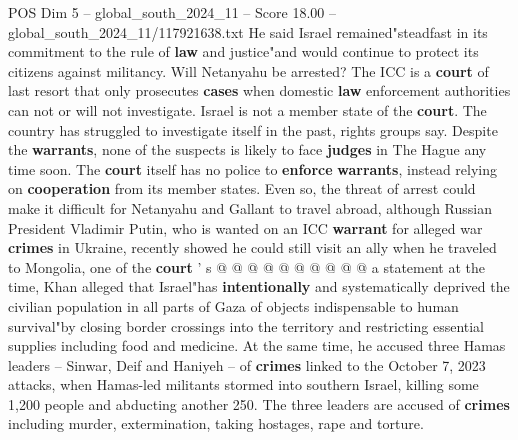 \begin{textsample}{POS Dim 5 – global\_south\_2024\_11 – Score 18.00 – global\_south\_2024\_11/117921638.txt}
He said Israel remained"steadfast in its commitment to the rule of \textbf{law} and justice"and would continue to protect its citizens against militancy.
Will Netanyahu be arrested?
The ICC is a \textbf{court} of last resort that only prosecutes \textbf{cases} when domestic \textbf{law} enforcement authorities can not or will not investigate.
Israel is not a member state of the \textbf{court}.
The country has struggled to investigate itself in the past, rights groups say.
Despite the \textbf{warrants}, none of the suspects is likely to face \textbf{judges} in The Hague any time soon.
The \textbf{court} itself has no police to \textbf{enforce} \textbf{warrants}, instead relying on \textbf{cooperation} from its member states.
Even so, the threat of arrest could make it difficult for Netanyahu and Gallant to travel abroad, although Russian President Vladimir Putin, who is wanted on an ICC \textbf{warrant} for alleged war \textbf{crimes} in Ukraine, recently showed he could still visit an ally when he traveled to Mongolia, one of the \textbf{court} ' s @ @ @ @ @ @ @ @ @ @ a statement at the time, Khan alleged that Israel"has \textbf{intentionally} and systematically deprived the civilian population in all parts of Gaza of objects indispensable to human survival"by closing border crossings into the territory and restricting essential supplies including food and medicine.
At the same time, he accused three Hamas leaders -- Sinwar, Deif and Haniyeh -- of \textbf{crimes} linked to the October 7, 2023 attacks, when Hamas-led militants stormed into southern Israel, killing some 1,200 people and abducting another 250.
The three leaders are accused of \textbf{crimes} including murder, extermination, taking hostages, rape and torture.

\end{textsample}
